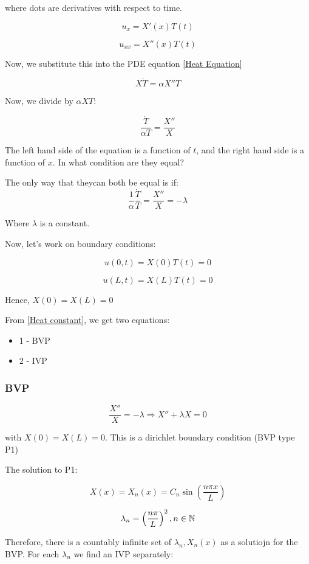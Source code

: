 \documentclass{article}
\begin{document}
where dots are derivatives with respect to time. 

$$u_x = X'(x) T(t)$$

$$u_{xx} = X''(x) T(t)$$

Now, we substitute this into the PDE equation \ref{Heat Equation}

$$X \dot{T} = \alpha X'' T$$

Now, we divide by $\alpha XT$:

$$\frac{\dot{T}}{\alpha T} = \frac{X''}{X}$$

The left hand side of the equation is a function of $t$, and the right hand side is a function of $x$. In what condition are they equal?

The only way that theycan both be equal is if:
\begin{equation}
\label{Heat constant}
    \frac{1}{\alpha} \frac{\dot{T}}{T} = \frac{X''}{X} = - \lambda
\end{equation}


Where $\lambda$ is a constant. 

\hfill

Now, let's work on boundary conditions:

$$u(0,t) = X(0) T(t) = 0$$

$$u(L,t) = X(L) T(t) = 0$$


\begin{center}
    Hence, $X(0) = X(L) = 0$
\end{center}

From \ref{Heat constant}, we get two equations: 

\begin{itemize}
    \item 1 - BVP
    \item 2 - IVP
\end{itemize}

\subsubsection{BVP}

$$\frac{X''}{X} = -\lambda \Rightarrow X'' + \lambda X = 0$$

with $X(0) = X(L) = 0$. This is a dirichlet boundary condition (BVP type P1)

The solution to P1:

$$X(x) = X_n (x) = C_n \sin(\frac{n \pi x}{L})$$

$$\lambda_n = \left( \frac{n \pi}{L}\right)^2, n \in \mathbb{N}$$

Therefore, there is a countably infinite set of $\lambda_n, X_n (x)$ as a solutiojn for the BVP. For each $\lambda_n$ we find an IVP separately:
\end{document}
